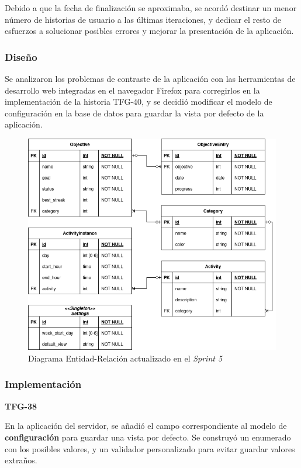 \documentclass[10pt, a4paper]{aqademic}
\begin{document}
Debido a que la fecha de finalización se aproximaba, se acordó destinar un menor número de historias de usuario a las últimas iteraciones, y dedicar el resto de esfuerzos a solucionar posibles errores y mejorar la presentación de la aplicación.

 
\subsubsection*{Diseño}

Se analizaron los problemas de contraste de la aplicación con las herramientas de desarrollo web integradas en el navegador Firefox \cite{noauthor_firefox_nodate} para corregirlos en la implementación de la historia TFG-40, y se decidió modificar el modelo de configuración en la base de datos para guardar la vista por defecto de la aplicación.

\begin{figure}[hbt!]
	\centering
	\includegraphics[scale=0.6]{img/sprint5-modelo-datos.png}
	\caption{Diagrama Entidad-Relación actualizado en el \textit{Sprint 5}}
\end{figure}


\subsubsection{Implementación}

\textbf{TFG-38}

En la aplicación del servidor, se añadió el campo correspondiente al modelo de \textbf{configuración} para guardar una vista por defecto. Se construyó un enumerado con los posibles valores, y un validador personalizado para evitar guardar valores extraños.
\end{document}
